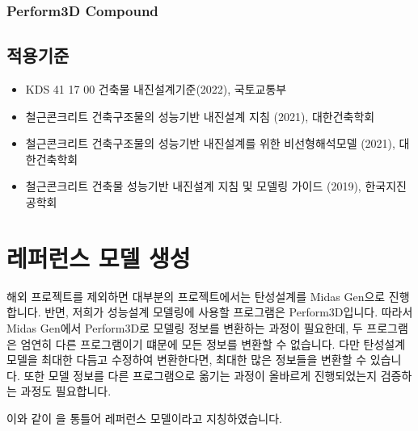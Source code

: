 \documentclass[a4paper,11pt,korean,openany,oneside]{sphinxmanual}
\begin{document}
\subsection{Perform\sphinxhyphen{}3D Compound}
\label{\detokenize{0_intro_latex:perform-3d-compound}}

\section{적용기준}
\label{\detokenize{0_intro_latex:id10}}\begin{itemize}
\item {} 
\sphinxAtStartPar
KDS 41 17 00 건축물 내진설계기준(2022), 국토교통부

\item {} 
\sphinxAtStartPar
철근콘크리트 건축구조물의 성능기반 내진설계 지침 (2021), 대한건축학회

\item {} 
\sphinxAtStartPar
철근콘크리트 건축구조물의 성능기반 내진설계를 위한 비선형해석모델 (2021), 대한건축학회

\item {} 
\sphinxAtStartPar
철근콘크리트 건축물 성능기반 내진설계 지침 및 모델링 가이드 (2019), 한국지진공학회

\end{itemize}

\sphinxstepscope


\chapter{레퍼런스 모델 생성}
\label{\detokenize{1_ref_model:id1}}\label{\detokenize{1_ref_model::doc}}
\sphinxAtStartPar
해외 프로젝트를 제외하면 대부분의 프로젝트에서는 탄성설계를 Midas Gen으로 진행합니다. 반면, 저희가 성능설계 모델링에 사용할 프로그램은 Perform\sphinxhyphen{}3D입니다.
따라서 Midas Gen에서 Perform\sphinxhyphen{}3D로 모델링 정보를 변환하는 과정이 필요한데, 두 프로그램은 엄연히 다른 프로그램이기 떄문에 모든 정보를 변환할 수 없습니다.
다만 탄성설계 모델을 최대한 다듬고 수정하여 변환한다면, 최대한 많은 정보들을 변환할 수 있습니다.
또한 모델 정보를 다른 프로그램으로 옮기는 과정이 올바르게 진행되었는지 검증하는 과정도 필요합니다.

\sphinxAtStartPar
이와 같이 을 통틀어 레퍼런스 모델이라고 지칭하였습니다.

\begin{figure}[htbp]
\centering
\capstart

\noindent{}
\caption{}\label{\detokenize{1_ref_model:id2}}\end{figure}
\end{document}
